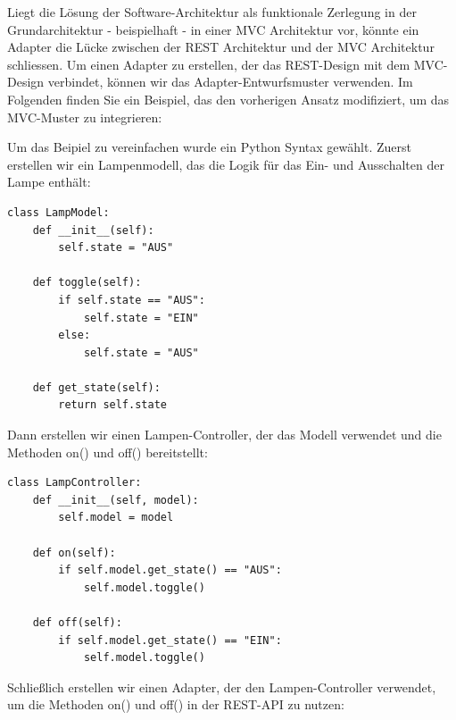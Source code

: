 Liegt die Lösung der Software-Architektur als funktionale Zerlegung in der Grundarchitektur - beispielhaft - in einer MVC Architektur vor, könnte ein Adapter die Lücke zwischen der REST Architektur und der MVC Architektur schliessen. Um einen Adapter zu erstellen, der das REST-Design mit dem MVC-Design verbindet, können wir das Adapter-Entwurfsmuster verwenden. Im Folgenden finden Sie ein Beispiel, das den vorherigen Ansatz modifiziert, um das MVC-Muster zu integrieren:


Um das Beipiel zu vereinfachen wurde ein Python Syntax gewählt. Zuerst erstellen wir ein Lampenmodell, das die Logik für das Ein- und Ausschalten der Lampe enthält:\\
\noindent\begin{minipage}{\textwidth}
\begin{lstlisting}[caption={LampModel},captionpos=b,label={lst:lamp_m}]
class LampModel:
    def __init__(self):
        self.state = "AUS"

    def toggle(self):
        if self.state == "AUS":
            self.state = "EIN"
        else:
            self.state = "AUS"

    def get_state(self):
        return self.state

\end{lstlisting}
\end{minipage}
Dann erstellen wir einen Lampen-Controller, der das Modell verwendet und die Methoden on() und off() bereitstellt:\\
\noindent\begin{minipage}{\textwidth}
\begin{lstlisting}[caption={LampController},captionpos=b,label={lst:lamp_c}]
class LampController:
    def __init__(self, model):
        self.model = model

    def on(self):
        if self.model.get_state() == "AUS":
            self.model.toggle()

    def off(self):
        if self.model.get_state() == "EIN":
            self.model.toggle()
\end{lstlisting}
\end{minipage}
Schließlich erstellen wir einen Adapter, der den Lampen-Controller verwendet, um die Methoden on() und off() in der REST-API zu nutzen:\\
